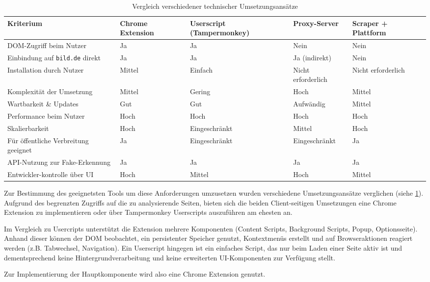 \begin{table}[ht]
    \centering
    \renewcommand{\arraystretch}{1.3}
    \begin{tabular}{|p{2.5cm}|p{2.5cm}|p{2.5cm}|p{2.5cm}|p{2.5cm}|}
        \hline
        \textbf{Kriterium} & \textbf{Chrome Extension} & \textbf{Userscript (Tampermonkey)} & \textbf{Proxy-Server} & \textbf{Scraper + Plattform} \\
        \hline
        DOM-Zugriff beim Nutzer & Ja & Ja & Nein & Nein \\
        \hline
        Einbindung auf \texttt{bild.de} direkt & Ja & Ja & Ja (indirekt) & Nein \\
        \hline
        Installation durch Nutzer & Mittel & Einfach & Nicht erforderlich & Nicht erforderlich\\
        \hline
        Komplexität der Umsetzung & Mittel & Gering & Hoch & Mittel \\
        \hline
        Wartbarkeit \& Updates & Gut & Gut & Aufwändig & Mittel \\
        \hline
        Performance beim Nutzer & Hoch & Hoch & Hoch & Hoch \\
        \hline
        Skalierbarkeit & Hoch & Eingeschränkt & Mittel & Hoch \\
        \hline
        Für öffentliche Verbreitung geeignet & Ja & Eingeschränkt & Eingeschränkt & Ja \\
        \hline
        API-Nutzung zur Fake-Erkennung & Ja & Ja & Ja & Ja \\
        \hline
        Entwickler-kontrolle über UI & Hoch & Mittel & Hoch & Mittel \\
        \hline
    \end{tabular}
    \caption{Vergleich verschiedener technischer Umsetzungsansätze}
    \label{table:technischeAnsaetze}
\end{table}

Zur Bestimmung des geeignetsten Tools um diese Anforderungen umzusetzen wurden verschiedene Umsetzungsansätze verglichen (siehe \ref{table:technischeAnsaetze}).
Aufgrund des begrenzten Zugriffs auf die zu analysierende Seiten, bieten sich die beiden Client-seitigen Umsetzungen 
eine Chrome Extension zu implementieren oder über Tampermonkey Userscripts auszuführen am ehesten an.

Im Vergleich zu Usercripts unterstützt die Extension mehrere Komponenten (Content Scripts, Background Scripts, Popup, Optionsseite).
Anhand dieser können der DOM beobachtet, ein persistenter Speicher genutzt, Kontextmenüs erstellt und auf Browseraktionen reagiert werden (z.B. Tabwechsel, Navigation).
Ein Userscript hingegen ist ein einfaches Script, das nur beim Laden einer Seite aktiv ist und dementsprechend keine Hintergrundverarbeitung und keine erweiterten UI-Komponenten
zur Verfügung stellt.

Zur Implementierung der Hauptkomponente wird also eine Chrome Extension genutzt.

    
    
    